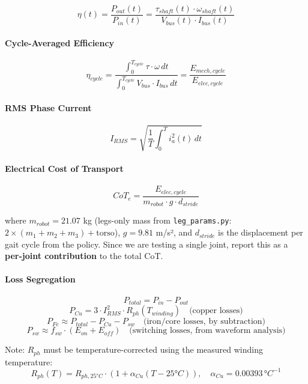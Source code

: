 \documentclass[
]{article}
\begin{document}
\[
\eta(t) = \frac{P_{out}(t)}{P_{in}(t)} = \frac{\tau_{shaft}(t) \cdot \omega_{shaft}(t)}{V_{bus}(t) \cdot I_{bus}(t)}
\]

\paragraph{Cycle-Averaged Efficiency}\label{cycle-averaged-efficiency}

\[
\eta_{cycle} = \frac{\int_0^{T_{cycle}} \tau \cdot \omega \, dt}{\int_0^{T_{cycle}} V_{bus} \cdot I_{bus} \, dt}
= \frac{E_{mech,cycle}}{E_{elec,cycle}}
\]

\paragraph{RMS Phase Current}\label{rms-phase-current}

\[
I_{RMS} = \sqrt{\frac{1}{T} \int_0^T i_a^2(t) \, dt}
\]

\paragraph{Electrical Cost of
Transport}\label{electrical-cost-of-transport}

\[
CoT_e = \frac{E_{elec,cycle}}{m_{robot} \cdot g \cdot d_{stride}}
\]

where \(m_{robot} = 21.07\) kg (legs-only mass from
\texttt{leg\_params.py}: \(2 \times (m_1 + m_2 + m_3)
+ \text{torso}\)), \(g = 9.81\) m/s², and \(d_{stride}\) is the
displacement per gait cycle from the policy. Since we are testing a
single joint, report this as a \textbf{per-joint contribution} to the
total CoT.

\paragraph{Loss Segregation}\label{loss-segregation}

\[
P_{total} = P_{in} - P_{out}
\] \[
P_{Cu} = 3 \cdot I_{RMS}^2 \cdot R_{ph}(T_{winding}) \quad \text{(copper losses)}
\] \[
P_{Fe} \approx P_{total} - P_{Cu} - P_{sw} \quad \text{(iron/core losses, by subtraction)}
\] \[
P_{sw} \approx f_{sw} \cdot (E_{on} + E_{off}) \quad \text{(switching losses, from waveform analysis)}
\]

Note: \(R_{ph}\) must be temperature-corrected using the measured
winding temperature: \[
R_{ph}(T) = R_{ph,25°C} \cdot \left(1 + \alpha_{Cu}(T - 25°C)\right), \quad \alpha_{Cu} = 0.00393 \, °C^{-1}
\]
\end{document}
